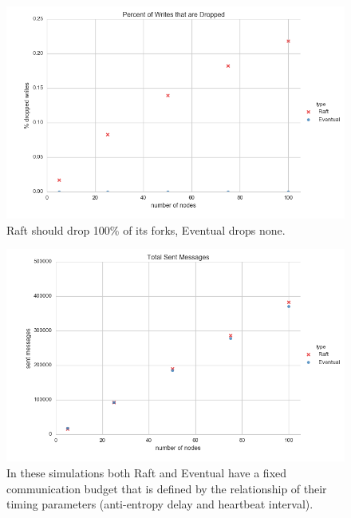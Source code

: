 \documentclass[11pt,letterpaper]{article}
\begin{document}
\begin{figure}[!h]
    \centering
        \includegraphics[width=\textwidth]{figures/dropped_writes.png}
        \caption{\textsf{Raft should drop 100\% of its forks, Eventual drops none.}}
        \label{fig:dropped_writes}
\end{figure}

\begin{figure}[!h]
    \centering
        \includegraphics[width=\textwidth]{figures/messages_sent.png}
        \caption{\textsf{In these simulations both Raft and Eventual have a fixed communication budget that is defined by the relationship of their timing parameters (anti-entropy delay and heartbeat interval).}}
        \label{fig:messages_sent}
\end{figure}
\end{document}
